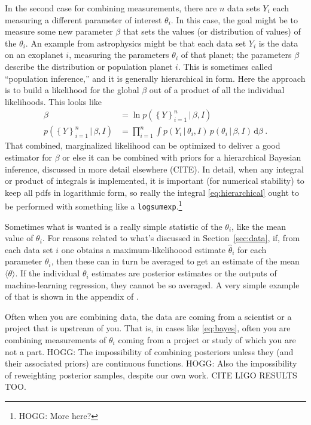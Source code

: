 \documentclass{article}
\newcommand{\sectionname}{Section}
\newcommand{\secref}[1]{\sectionname~\ref{#1}}
\newcommand{\dd}{\mathrm{d}}
\newcommand{\given}{\,|\,}
\newcommand{\setof}[1]{\left\{{#1}\right\}}
\begin{document}
In the second case for combining measurements, there are $n$ data sets $Y_i$ each measuring a different parameter of interest $\theta_i$.
In this case, the goal might be to measure some new parameter $\beta$ that sets the values (or distribution of values) of the $\theta_i$.
An example from astrophysics might be that each data set $Y_i$ is the data on an exoplanet $i$, measuring the parameters $\theta_i$ of that planet; the parameters $\beta$ describe the distribution or population planet $i$.
This is sometimes called ``population inference,'' and it is generally hierarchical in form.
Here the approach is to build a likelihood for the global $\beta$ out of a product of all the individual likelihoods.
This looks like
\begin{align}
    \mathscr{\beta} &= \ln p(\setof{Y}_{i=1}^n\given\beta,I) \\
    p(\setof{Y}_{i=1}^n\given\beta,I) &= \prod_{i=1}^n \int p(Y_i\given\theta_i,I)\,p(\theta_i\given\beta,I)\,\dd\beta ~.\label{eq:hierarchical}
\end{align}
That combined, marginalized likelihood can be optimized to deliver a good estimator for $\beta$ or else it can be combined with priors for a hierarchical Bayesian inference, discussed in more detail elsewhere (CITE).
In detail, when any integral or product of integrals is implemented, it is important (for numerical stability) to keep all pdfs in logarithmic form, so really the integral \eqref{eq:hierarchical} ought to be performed with something like a \texttt{logsumexp}.\footnote{HOGG: More here?}

Sometimes what is wanted is a really simple statistic of the $\theta_i$, like the mean value of $\theta_i$.
For reasons related to what's discussed in \secref{sec:data}, if, from each data set $i$ one obtains a maximum-likelihoood estimate $\hat\theta_i$ for each parameter $\theta_i$, then these can in turn be averaged to get an estimate of the mean $\langle\theta\rangle$.
If the individual $\theta_i$ estimates are posterior estimates or the outputs of machine-learning regression, they cannot be so averaged.
A very simple example of that is shown in the appendix of \cite{goodorbad}.

Often when you are combining data, the data are coming from a scientist or a project that is upstream of you.
That is, in cases like \eqref{eq:bayes}, often you are combining measurements of $\theta_i$ coming from a project or study of which you are not a part.
HOGG: The impossibility of combining posteriors unless they (and their associated priors) are continuous functions.
HOGG: Also the impossibility of reweighting posterior samples, despite our own work. CITE LIGO RESULTS TOO.
\end{document}
